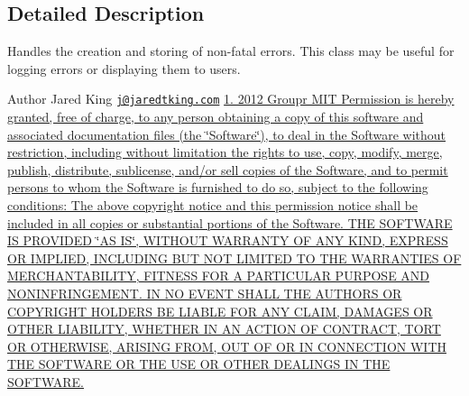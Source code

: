 \subsection{Detailed Description}
Handles the creation and storing of non-\/fatal errors. This class may be useful for logging errors or displaying them to users. \begin{DoxyAuthor}{Author}
Jared King \href{mailto:j@jaredtking.com}{\tt j@jaredtking.\-com} \hyperlink{}{1.  2012 Groupr  M\-I\-T Permission is hereby granted, free of charge, to any person obtaining a copy of this software and associated documentation files (the \char`\"{}\-Software\char`\"{}), to deal in the Software without restriction, including without limitation the rights to use, copy, modify, merge, publish, distribute, sublicense, and/or sell copies of the Software, and to permit persons to whom the Software is furnished to do so, subject to the following conditions\-:  The above copyright notice and this permission notice shall be included in all copies or substantial portions of the Software.  T\-H\-E S\-O\-F\-T\-W\-A\-R\-E I\-S P\-R\-O\-V\-I\-D\-E\-D \char`\"{}\-A\-S I\-S\char`\"{}, W\-I\-T\-H\-O\-U\-T W\-A\-R\-R\-A\-N\-T\-Y O\-F A\-N\-Y K\-I\-N\-D, E\-X\-P\-R\-E\-S\-S O\-R I\-M\-P\-L\-I\-E\-D, I\-N\-C\-L\-U\-D\-I\-N\-G B\-U\-T N\-O\-T L\-I\-M\-I\-T\-E\-D T\-O T\-H\-E W\-A\-R\-R\-A\-N\-T\-I\-E\-S O\-F M\-E\-R\-C\-H\-A\-N\-T\-A\-B\-I\-L\-I\-T\-Y, F\-I\-T\-N\-E\-S\-S F\-O\-R A P\-A\-R\-T\-I\-C\-U\-L\-A\-R P\-U\-R\-P\-O\-S\-E A\-N\-D N\-O\-N\-I\-N\-F\-R\-I\-N\-G\-E\-M\-E\-N\-T. I\-N N\-O E\-V\-E\-N\-T S\-H\-A\-L\-L T\-H\-E A\-U\-T\-H\-O\-R\-S O\-R C\-O\-P\-Y\-R\-I\-G\-H\-T H\-O\-L\-D\-E\-R\-S B\-E L\-I\-A\-B\-L\-E F\-O\-R A\-N\-Y C\-L\-A\-I\-M, D\-A\-M\-A\-G\-E\-S O\-R O\-T\-H\-E\-R L\-I\-A\-B\-I\-L\-I\-T\-Y, W\-H\-E\-T\-H\-E\-R I\-N A\-N A\-C\-T\-I\-O\-N O\-F C\-O\-N\-T\-R\-A\-C\-T, T\-O\-R\-T O\-R O\-T\-H\-E\-R\-W\-I\-S\-E, A\-R\-I\-S\-I\-N\-G F\-R\-O\-M, O\-U\-T O\-F O\-R I\-N C\-O\-N\-N\-E\-C\-T\-I\-O\-N W\-I\-T\-H T\-H\-E S\-O\-F\-T\-W\-A\-R\-E O\-R T\-H\-E U\-S\-E O\-R O\-T\-H\-E\-R D\-E\-A\-L\-I\-N\-G\-S I\-N T\-H\-E S\-O\-F\-T\-W\-A\-R\-E. }
\end{DoxyAuthor}


